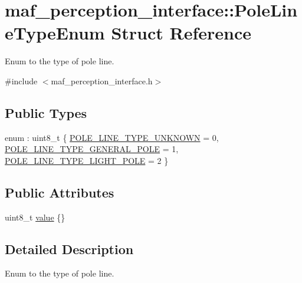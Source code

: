 \hypertarget{structmaf__perception__interface_1_1PoleLineTypeEnum}{}\section{maf\+\_\+perception\+\_\+interface\+:\+:Pole\+Line\+Type\+Enum Struct Reference}
\label{structmaf__perception__interface_1_1PoleLineTypeEnum}


Enum to the type of pole line.  




{\ttfamily \#include $<$maf\+\_\+perception\+\_\+interface.\+h$>$}

\subsection*{Public Types}
\begin{DoxyCompactItemize}
\item 
enum \+: uint8\+\_\+t \{ \hyperlink{structmaf__perception__interface_1_1PoleLineTypeEnum_a644d30a6a12b86576f8aa745c69e73c0abfdf3c9e7ba962ecdca1c81b6ba6f657}{P\+O\+L\+E\+\_\+\+L\+I\+N\+E\+\_\+\+T\+Y\+P\+E\+\_\+\+U\+N\+K\+N\+O\+WN} = 0, 
\hyperlink{structmaf__perception__interface_1_1PoleLineTypeEnum_a644d30a6a12b86576f8aa745c69e73c0aa92fe6d41c8c5593e0448a2f9ff7948e}{P\+O\+L\+E\+\_\+\+L\+I\+N\+E\+\_\+\+T\+Y\+P\+E\+\_\+\+G\+E\+N\+E\+R\+A\+L\+\_\+\+P\+O\+LE} = 1, 
\hyperlink{structmaf__perception__interface_1_1PoleLineTypeEnum_a644d30a6a12b86576f8aa745c69e73c0a26340d90b7cb5e75b1df99394aa7bcfd}{P\+O\+L\+E\+\_\+\+L\+I\+N\+E\+\_\+\+T\+Y\+P\+E\+\_\+\+L\+I\+G\+H\+T\+\_\+\+P\+O\+LE} = 2
 \}
\end{DoxyCompactItemize}
\subsection*{Public Attributes}
\begin{DoxyCompactItemize}
\item 
uint8\+\_\+t \hyperlink{structmaf__perception__interface_1_1PoleLineTypeEnum_af83491717991cdea1cb03d61a73e68aa}{value} \{\}
\end{DoxyCompactItemize}


\subsection{Detailed Description}
Enum to the type of pole line. 

